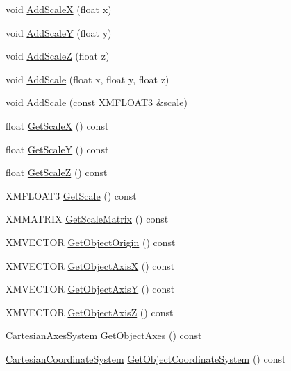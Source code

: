 \begin{DoxyCompactItemize}
void \hyperlink{structmage_1_1_transform_afb49f4e4ca1772f8ed38465afcf414a0}{Add\+ScaleX} (float x)
\item 
void \hyperlink{structmage_1_1_transform_ae3213b5cc2b347236783389c1b717356}{Add\+ScaleY} (float y)
\item 
void \hyperlink{structmage_1_1_transform_aa493f3a588376d094ce50dfcffe0ece2}{Add\+ScaleZ} (float z)
\item 
void \hyperlink{structmage_1_1_transform_a10681b78ac7980fa3aa6c6c11a274f99}{Add\+Scale} (float x, float y, float z)
\item 
void \hyperlink{structmage_1_1_transform_a7f5092b95426c47a55bd3dff16cea31e}{Add\+Scale} (const X\+M\+F\+L\+O\+A\+T3 \&scale)
\item 
float \hyperlink{structmage_1_1_transform_a3a82465d40dde6b98ca274a8de061545}{Get\+ScaleX} () const
\item 
float \hyperlink{structmage_1_1_transform_acbd677fa7e27cb15d205ac8354d8624a}{Get\+ScaleY} () const
\item 
float \hyperlink{structmage_1_1_transform_a9e8f3a4ec330e6f4c9e1a9607daf30fa}{Get\+ScaleZ} () const
\item 
X\+M\+F\+L\+O\+A\+T3 \hyperlink{structmage_1_1_transform_a38234d822ee1ffbbcfb2601a1d5f8475}{Get\+Scale} () const
\item 
X\+M\+M\+A\+T\+R\+IX \hyperlink{structmage_1_1_transform_ab78050be41abf1ab36d969d5235f97e2}{Get\+Scale\+Matrix} () const
\item 
X\+M\+V\+E\+C\+T\+OR \hyperlink{structmage_1_1_transform_a2f7cfedf5c67115cb6c29aac07c71d07}{Get\+Object\+Origin} () const
\item 
X\+M\+V\+E\+C\+T\+OR \hyperlink{structmage_1_1_transform_a1817e9ff4397b5a107541b92a01b91fc}{Get\+Object\+AxisX} () const
\item 
X\+M\+V\+E\+C\+T\+OR \hyperlink{structmage_1_1_transform_a1d2b560af18a18246186cdb8477e9019}{Get\+Object\+AxisY} () const
\item 
X\+M\+V\+E\+C\+T\+OR \hyperlink{structmage_1_1_transform_af6bf20352279957fdba5041074bdf9c2}{Get\+Object\+AxisZ} () const
\item 
\hyperlink{structmage_1_1_cartesian_axes_system}{Cartesian\+Axes\+System} \hyperlink{structmage_1_1_transform_a814f749d70104ec5732a741b0b2b7220}{Get\+Object\+Axes} () const
\item 
\hyperlink{structmage_1_1_cartesian_coordinate_system}{Cartesian\+Coordinate\+System} \hyperlink{structmage_1_1_transform_a6c14d929c23c6b6e065e7f9b0ed919ea}{Get\+Object\+Coordinate\+System} () const

\end{DoxyCompactItemize}
